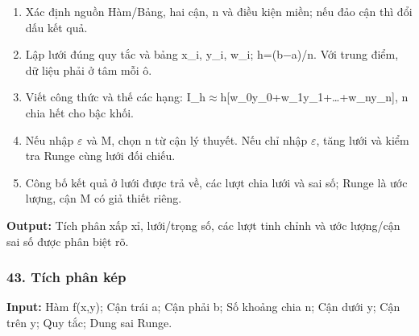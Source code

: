 \begin{enumerate}

\item Xác định nguồn Hàm/\allowbreak{}Bảng,\allowbreak{} hai cận,\allowbreak{} n và điều kiện miền;\allowbreak{} nếu đảo cận thì đổi dấu kết quả.

\item Lập lưới đúng quy tắc và bảng x\_i,\allowbreak{} y\_i,\allowbreak{} w\_i;\allowbreak{} h=\allowbreak{}(\allowbreak{}b\ensuremath{-}a)/\allowbreak{}n. Với trung điểm,\allowbreak{} dữ liệu phải ở tâm mỗi ô.

\item Viết công thức và thế các hạng: I\_h\ensuremath{\approx}h[w\_0y\_0+\allowbreak{}w\_1y\_1+\allowbreak{}…+\allowbreak{}w\_ny\_n],\allowbreak{} n chia hết cho bậc khối.

\item Nếu nhập \ensuremath{\varepsilon} và M,\allowbreak{} chọn n từ cận lý thuyết. Nếu chỉ nhập \ensuremath{\varepsilon},\allowbreak{} tăng lưới và kiểm tra Runge cùng lưới đối chiếu.

\item Công bố kết quả ở lưới được trả về,\allowbreak{} các lượt chia lưới và sai số;\allowbreak{} Runge là ước lượng,\allowbreak{} cận M có giả thiết riêng.

\end{enumerate}

\textbf{Output:} Tích phân xấp xỉ,\allowbreak{} lưới/\allowbreak{}trọng số,\allowbreak{} các lượt tinh chỉnh và ước lượng/\allowbreak{}cận sai số được phân biệt rõ.

\examplebreak\subsubsection*{43. Tích phân kép}

\textbf{Input:} Hàm f(\allowbreak{}x,\allowbreak{}y);\allowbreak{} Cận trái a;\allowbreak{} Cận phải b;\allowbreak{} Số khoảng chia n;\allowbreak{} Cận dưới y;\allowbreak{} Cận trên y;\allowbreak{} Quy tắc;\allowbreak{} Dung sai Runge.


